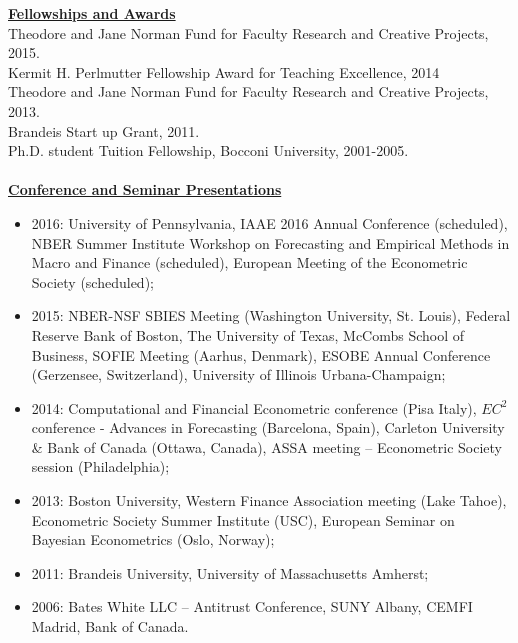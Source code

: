 \documentclass[12pt]{article}
\begin{document}
\underline{\textbf{Fellowships and Awards}}\\
Theodore and Jane Norman Fund for Faculty Research and Creative Projects, 2015. \\
Kermit H. Perlmutter Fellowship Award for Teaching Excellence, 2014 \\
Theodore and Jane Norman Fund for Faculty Research and Creative Projects, 2013. \\
Brandeis Start up Grant, 2011. \\
Ph.D. student Tuition Fellowship, Bocconi University, 2001-2005.\\ \\
\underline{\textbf{Conference and Seminar Presentations}}
\begin{itemize}
	\item 2016: University of Pennsylvania, IAAE 2016 Annual Conference (scheduled), NBER Summer Institute Workshop on Forecasting and Empirical Methods in Macro and Finance (scheduled), European Meeting of the Econometric Society (scheduled);
  \item 2015: NBER-NSF SBIES Meeting (Washington University, St. Louis), Federal Reserve Bank of Boston, The University of Texas, McCombs School of Business, SOFIE Meeting (Aarhus, Denmark), ESOBE Annual Conference (Gerzensee, Switzerland), University of Illinois Urbana-Champaign;
	\item 2014: Computational and Financial Econometric conference (Pisa Italy), $EC^2$ conference - Advances in Forecasting (Barcelona, Spain),  Carleton University & Bank of Canada (Ottawa, Canada), ASSA meeting -- Econometric Society session (Philadelphia);  
	\item 2013: Boston University, Western Finance Association meeting (Lake Tahoe), Econometric Society Summer Institute (USC), European Seminar on Bayesian Econometrics (Oslo, Norway); 
	\item 2011: Brandeis University, University of Massachusetts Amherst; 
	\item 2006: Bates White LLC -- Antitrust Conference, SUNY Albany, CEMFI Madrid, Bank of Canada.
\end{itemize}
\end{document}
